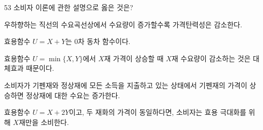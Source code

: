 \begin{question}{53}
소비자 이론에 관한 설명으로 옳은 것은?
\begin{choices}
  \item 우하향하는 직선의 수요곡선상에서 수요량이 증가할수록 가격탄력성은 감소한다.
  \item 효용함수 $U=X+Y$는 0차 동차 함수이다.
  \item 효용함수 $U=\min\{X , Y\}$에서 $X$재 가격이 상승할 때 $X$재 수요량이 감소하는 것은 대체효과 때문이다.
  \item 소비자가 기펜재와 정상재에 모든 소득을 지출하고 있는 상태에서 기펜재의 가격이 상승하면 정상재에 대한 수요는 증가한다.
  \item 효용함수 $U=X+2Y$이고, 두 재화의 가격이 동일하다면, 소비자는 효용 극대화를 위해 $X$재만을 소비한다.
\end{choices}
\end{question}

